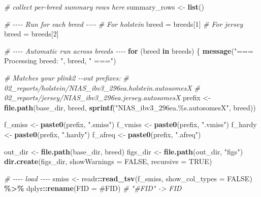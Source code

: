\documentclass[
]{article}
\newenvironment{Shaded}{\begin{snugshade}}{\end{snugshade}}
\newcommand{\AttributeTok}[1]{\textcolor[rgb]{0.13,0.29,0.53}{#1}}
\newcommand{\CommentTok}[1]{\textcolor[rgb]{0.56,0.35,0.01}{\textit{#1}}}
\newcommand{\ConstantTok}[1]{\textcolor[rgb]{0.56,0.35,0.01}{#1}}
\newcommand{\ControlFlowTok}[1]{\textcolor[rgb]{0.13,0.29,0.53}{\textbf{#1}}}
\newcommand{\DecValTok}[1]{\textcolor[rgb]{0.00,0.00,0.81}{#1}}
\newcommand{\FunctionTok}[1]{\textcolor[rgb]{0.13,0.29,0.53}{\textbf{#1}}}
\newcommand{\NormalTok}[1]{#1}
\newcommand{\OtherTok}[1]{\textcolor[rgb]{0.56,0.35,0.01}{#1}}
\newcommand{\SpecialCharTok}[1]{\textcolor[rgb]{0.81,0.36,0.00}{\textbf{#1}}}
\newcommand{\StringTok}[1]{\textcolor[rgb]{0.31,0.60,0.02}{#1}}
\begin{document}
\begin{Shaded}
\begin{Highlighting}[]
\CommentTok{\# collect per{-}breed summary rows here}
\NormalTok{summary\_rows }\OtherTok{\textless{}{-}} \FunctionTok{list}\NormalTok{()}

\CommentTok{\# {-}{-}{-}{-} Run for each breed {-}{-}{-}{-}}
\CommentTok{\# For holstein}
\NormalTok{breed }\OtherTok{=}\NormalTok{ breeds[}\DecValTok{1}\NormalTok{]}
\CommentTok{\# For jersey}
\NormalTok{breed }\OtherTok{=}\NormalTok{ breeds[}\DecValTok{2}\NormalTok{]}

\CommentTok{\# {-}{-}{-}{-} Automatic run across breeds {-}{-}{-}{-}}
\ControlFlowTok{for}\NormalTok{ (breed }\ControlFlowTok{in}\NormalTok{ breeds) \{}
  \FunctionTok{message}\NormalTok{(}\StringTok{"=== Processing breed: "}\NormalTok{, breed, }\StringTok{" ==="}\NormalTok{)}
  
  \CommentTok{\# Matches your plink2 {-}{-}out prefixes:}
  \CommentTok{\#   02\_reports/holstein/NIAS\_ibv3\_296ea.holstein.autosomesX}
  \CommentTok{\#   02\_reports/jersey/NIAS\_ibv3\_296ea.jersey.autosomesX}
\NormalTok{  prefix }\OtherTok{\textless{}{-}} \FunctionTok{file.path}\NormalTok{(base\_dir, breed, }\FunctionTok{sprintf}\NormalTok{(}\StringTok{"NIAS\_ibv3\_296ea.\%s.autosomesX"}\NormalTok{, breed))}
  
\NormalTok{  f\_smiss }\OtherTok{\textless{}{-}} \FunctionTok{paste0}\NormalTok{(prefix, }\StringTok{".smiss"}\NormalTok{)}
\NormalTok{  f\_vmiss }\OtherTok{\textless{}{-}} \FunctionTok{paste0}\NormalTok{(prefix, }\StringTok{".vmiss"}\NormalTok{)}
\NormalTok{  f\_hardy }\OtherTok{\textless{}{-}} \FunctionTok{paste0}\NormalTok{(prefix, }\StringTok{".hardy"}\NormalTok{)}
\NormalTok{  f\_afreq }\OtherTok{\textless{}{-}} \FunctionTok{paste0}\NormalTok{(prefix, }\StringTok{".afreq"}\NormalTok{)}
  
\NormalTok{  out\_dir  }\OtherTok{\textless{}{-}} \FunctionTok{file.path}\NormalTok{(base\_dir, breed)}
\NormalTok{  figs\_dir }\OtherTok{\textless{}{-}} \FunctionTok{file.path}\NormalTok{(out\_dir, }\StringTok{"figs"}\NormalTok{)}
  \FunctionTok{dir.create}\NormalTok{(figs\_dir, }\AttributeTok{showWarnings =} \ConstantTok{FALSE}\NormalTok{, }\AttributeTok{recursive =} \ConstantTok{TRUE}\NormalTok{)}
  
  \CommentTok{\# {-}{-}{-}{-} load {-}{-}{-}{-}}
\NormalTok{  smiss }\OtherTok{\textless{}{-}}\NormalTok{ readr}\SpecialCharTok{::}\FunctionTok{read\_tsv}\NormalTok{(f\_smiss, }\AttributeTok{show\_col\_types =} \ConstantTok{FALSE}\NormalTok{) }\SpecialCharTok{\%\textgreater{}\%}
\NormalTok{    dplyr}\SpecialCharTok{::}\FunctionTok{rename}\NormalTok{(}\AttributeTok{FID =} \StringTok{\textasciigrave{}}\AttributeTok{\#FID}\StringTok{\textasciigrave{}}\NormalTok{)  }\CommentTok{\# "\#FID" {-}\textgreater{} FID}
  

\end{Highlighting}
\end{Shaded}
\end{document}
